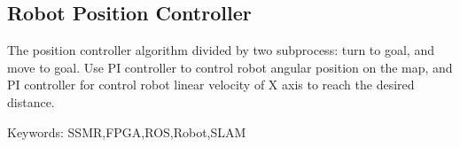 \begin{titlepage}
\subsection{Robot Position Controller}

The position controller algorithm divided by two subprocess: turn to goal, and move to goal. Use PI controller to control robot angular position on the map, and PI controller for control robot linear velocity of X axis to reach the desired distance.


Keywords: SSMR,FPGA,ROS,Robot,SLAM

\end{titlepage}


